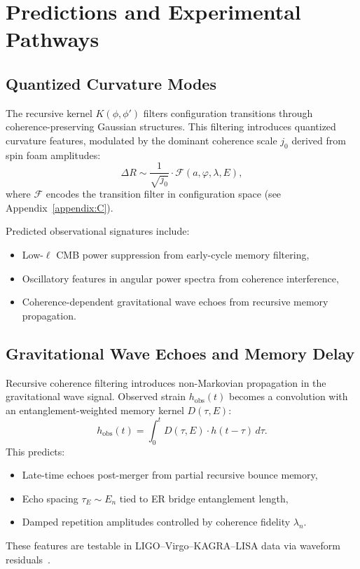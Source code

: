 \section{Predictions and Experimental Pathways}
\label{sec:predictions}

\subsection{Quantized Curvature Modes}

The recursive kernel $K(\phi, \phi')$ filters configuration transitions through coherence-preserving Gaussian structures. This filtering introduces quantized curvature features, modulated by the dominant coherence scale $j_0$ derived from spin foam amplitudes:
\[
\Delta R \sim \frac{1}{\sqrt{j_0}} \cdot \mathcal{F}(a, \varphi, \lambda, E),
\]
where $\mathcal{F}$ encodes the transition filter in configuration space (see Appendix~\ref{appendix:C}).

Predicted observational signatures include:
\begin{itemize}
  \item Low-$\ell$ CMB power suppression from early-cycle memory filtering,
  \item Oscillatory features in angular power spectra from coherence interference,
  \item Coherence-dependent gravitational wave echoes from recursive memory propagation.
\end{itemize}

\subsection{Gravitational Wave Echoes and Memory Delay}

Recursive coherence filtering introduces non-Markovian propagation in the gravitational wave signal. Observed strain $h_{\text{obs}}(t)$ becomes a convolution with an entanglement-weighted memory kernel $D(\tau, E)$:
\[
h_{\text{obs}}(t) = \int_0^t D(\tau, E) \cdot h(t - \tau) \, d\tau.
\]
This predicts:
\begin{itemize}
  \item Late-time echoes post-merger from partial recursive bounce memory,
  \item Echo spacing $\tau_E \sim E_n$ tied to ER bridge entanglement length,
  \item Damped repetition amplitudes controlled by coherence fidelity $\lambda_n$.
\end{itemize}
These features are testable in LIGO–Virgo–KAGRA–LISA data via waveform residuals~\cite{cardoso2016echoes, abedi2017echo}.

